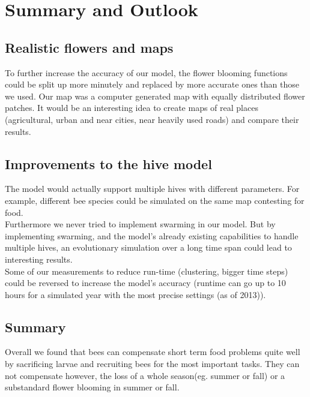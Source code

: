 \section{Summary and Outlook}
\subsection{Realistic flowers and maps}
	To further increase the accuracy of our model, the flower blooming functions could be split up more minutely and replaced by more accurate ones than those we used. Our map was a computer generated map with equally distributed flower patches. It would be an interesting idea to create maps of real places (agricultural, urban and near cities, near heavily used roads) and compare their results.
\subsection{Improvements to the hive model}
	The model would actually support multiple hives with different parameters. For example, different bee species could be simulated on the same map contesting for food. \\Furthermore we never tried to implement swarming in our model. But by implementing swarming, and the model's already existing capabilities to handle multiple hives, an evolutionary simulation over a long time span could lead to interesting results.\\Some of our measurements to reduce run-time (clustering, bigger time steps) could be reversed to increase the model's accuracy (runtime can go up to 10 hours for a simulated year with the most precise settings (as of 2013)).
\subsection{Summary}
	Overall we found that bees can compensate short term food problems quite well by sacrificing larvae and recruiting bees for the most important tasks. They can not compensate however, the loss of a whole season(eg. summer or fall) or a substandard flower blooming in summer or fall.